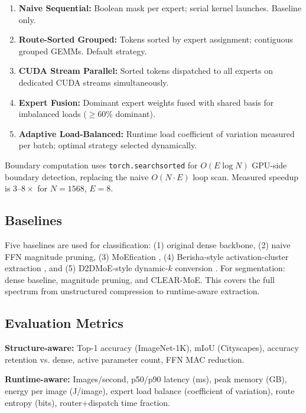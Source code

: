 \documentclass[conference]{IEEEtran}
\begin{document}
\begin{enumerate}
    \item \textbf{Naive Sequential:} Boolean mask per expert; serial kernel launches. Baseline only.
    \item \textbf{Route-Sorted Grouped:} Tokens sorted by expert assignment; contiguous grouped GEMMs. Default strategy.
    \item \textbf{CUDA Stream Parallel:} Sorted tokens dispatched to all experts on dedicated CUDA streams simultaneously.
    \item \textbf{Expert Fusion:} Dominant expert weights fused with shared basis for imbalanced loads ($\geq 60\%$ dominant).
    \item \textbf{Adaptive Load-Balanced:} Runtime load coefficient of variation measured per batch; optimal strategy selected dynamically.
\end{enumerate}

Boundary computation uses \texttt{torch.searchsorted} for $O(E \log N)$ GPU-side boundary detection, replacing the naive $O(N \cdot E)$ loop scan. Measured speedup is $3$--$8\times$ for $N = 1568$, $E = 8$.

\subsection{Baselines}

Five baselines are used for classification: (1) original dense backbone, (2) naive FFN magnitude pruning, (3) MoEfication \cite{zhang2022moefication}, (4) Berisha-style activation-cluster extraction \cite{berisha2025cvpr}, and (5) D2DMoE-style dynamic-$k$ conversion \cite{d2dmoe2024}. For segmentation: dense baseline, magnitude pruning, and CLEAR-MoE. This covers the full spectrum from unstructured compression to runtime-aware extraction.

\subsection{Evaluation Metrics}

\textbf{Structure-aware:} Top-1 accuracy (ImageNet-1K), mIoU (Cityscapes), accuracy retention vs. dense, active parameter count, FFN MAC reduction.

\textbf{Runtime-aware:} Images/second, p50/p90 latency (ms), peak memory (GB), energy per image (J/image), expert load balance (coefficient of variation), route entropy (bits), router+dispatch time fraction.

\end{document}
